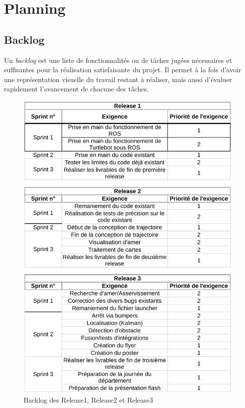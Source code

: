 \documentclass[10pt,a4paper]{article}
\begin{document}
\newpage
\section{Planning}
\label{sec:planning}

\subsection{Backlog}

Un \textit{backlog} est une liste de fonctionnalités ou de tâches jugées nécessaires et suffisantes pour la réalisation satisfaisante du projet.
Il permet à la fois d'avoir une représentation visuelle du travail restant à réaliser, mais aussi d'évaluer rapidement l'avancement de chacune des tâches.

\begin{figure}[!h]
  \centering
\noindent\centerline{\includegraphics[scale=0.35]{Backlog.png}}
  \caption{Backlog des Release1, Release2 et Release3}
\end{figure}
\end{document}
